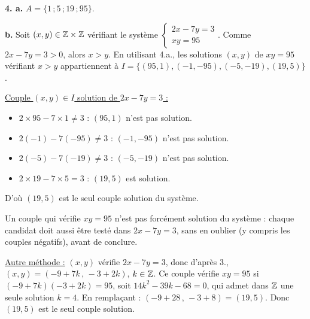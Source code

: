 \documentclass[11pt]{article}
\begin{document}
\textbf{4. a.} $A = \{1\,;5\,;19\,;95\}$.

\textbf{b.} Soit $(x, y) \in \mathbb{Z} \times \mathbb{Z}$ vérifiant le système $\begin{cases} 2x - 7y = 3 \\ xy = 95 \end{cases}$. Comme $2x - 7y = 3 > 0$, alors $x > y$. En utilisant 4.a., les solutions $(x, y)$ de $xy = 95$ vérifiant $x > y$ appartiennent à $I = \{(95, 1), (-1, -95), (-5, -19), (19, 5)\}$.

\underline{Couple $(x, y) \in I$ solution de $2x - 7y = 3$ :}
\begin{itemize}
  \item $2 \times 95 - 7 \times 1 \ne 3$ : $(95, 1)$ n'est pas solution.
  \item $2(-1) - 7(-95) \ne 3$ : $(-1, -95)$ n'est pas solution.
  \item $2(-5) - 7(-19) \ne 3$ : $(-5, -19)$ n'est pas solution.
  \item $2 \times 19 - 7 \times 5 = 3$ : $(19, 5)$ est solution.
\end{itemize}
D'où $(19, 5)$ est le seul couple solution du système.

\begin{piege}
Un couple qui vérifie $xy = 95$ n'est pas forcément solution du système :
chaque candidat doit aussi être testé dans $2x - 7y = 3$, sans en oublier
(y compris les couples négatifs), avant de conclure.
\end{piege}

\underline{Autre méthode :} $(x, y)$ vérifie $2x - 7y = 3$, donc d'après 3., $(x, y) = (-9 + 7k\,,\,-3 + 2k)$, $k \in \mathbb{Z}$. Ce couple vérifie $xy = 95$ si $(-9 + 7k)(-3 + 2k) = 95$, soit $14k^2 - 39k - 68 = 0$, qui admet dans $\mathbb{Z}$ une seule solution $k = 4$. En remplaçant : $(-9 + 28\,,\,-3 + 8) = (19, 5)$. Donc $(19, 5)$ est le seul couple solution.

\end{document}
